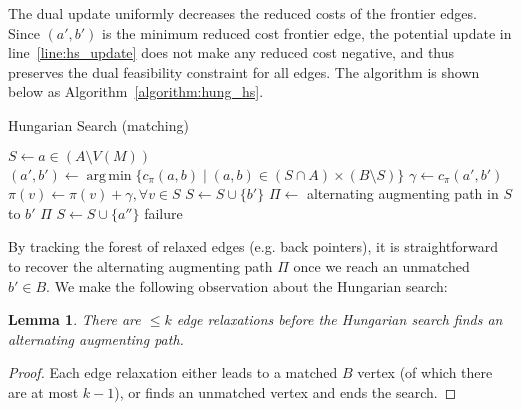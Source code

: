 \documentclass[11pt]{article}
\DeclareMathOperator*{\argmin}{arg\,min}
\theoremstyle{plain}
\newtheorem{lemma}{Lemma}
\begin{document}
The dual update uniformly decreases the reduced costs of the frontier edges.
Since $(a', b')$ is the minimum reduced cost frontier edge, the potential
update in line~\ref{line:hs_update} does not make any reduced cost negative,
and thus preserves the dual feasibility constraint for all edges.
The algorithm is shown below as Algorithm~\ref{algorithm:hung_hs}.

\begin{algorithm}
\caption{Hungarian Search (matching)}
\label{algorithm:hung_hs}
\begin{algorithmic}[1]
\Statex %
	\State $S \gets a \in (A \setminus V(M))$
	\Repeat
		\State $(a', b') \gets \argmin\{c_\pi(a, b) \mid (a, b) \in (S \cap A) \times (B \setminus S)\}$
		\State $\gamma \gets c_\pi(a', b')$
		\State $\pi(v) \gets \pi(v) + \gamma, \forall v \in S$
			\label{line:hs_update}
		\State $S \gets S \cup \{b'\}$
		\Statex %
		 
			\State $\Pi \gets$ alternating augmenting path in $S$ to $b'$
			\State\Return $\Pi$
		\Else {}
			\State $S \gets S \cup \{a''\}$
		\EndIf
	\State\Return failure
\EndFunction
\end{algorithmic}
\end{algorithm}

By tracking the forest of relaxed edges (e.g. back pointers), it is
straightforward to recover the alternating augmenting path $\Pi$ once we reach
an unmatched $b' \in B$.
We make the following observation about the Hungarian search:

\begin{lemma}
\label{lemma:hungsearch_length}
	There are $\leq k$ edge relaxations before the Hungarian search finds
	an alternating augmenting path.
\end{lemma}
\begin{proof}
	Each edge relaxation either leads to a matched $B$ vertex (of which
	there are at most $k-1$), or finds an unmatched vertex and ends the
	search.
\end{proof}
\end{document}
